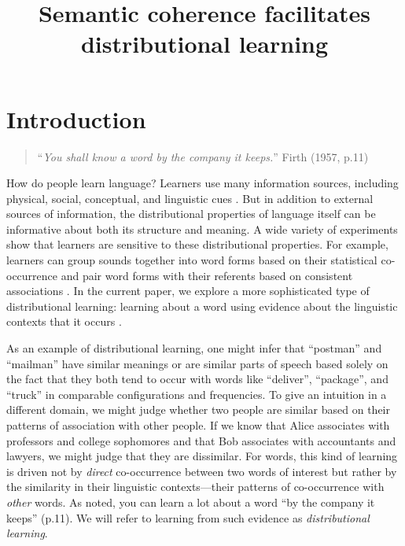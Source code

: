 \documentclass[man,longtable,floatsintext]{my-apa6}
\title{Semantic coherence facilitates distributional learning}
\begin{document}
\maketitle

\setcounter{secnumdepth}{3}

\section{Introduction}

\begin{quote}
``\emph{You shall know a word by the company it keeps.}'' Firth (1957, p.11)
\end{quote}

How do people learn language? Learners use many information sources, including physical, social, conceptual, and linguistic cues \citep{clark1988, markman1991, gleitman1990, baldwin1993, hollich2000}. But in addition to external sources of information, the distributional properties of language itself can be informative about both its structure and meaning. A wide variety of experiments show that learners are sensitive to these distributional properties. For example, learners can group sounds together into word forms based on their statistical co-occurrence \citep{saffran1996a, saffran1996b} and pair word forms with their referents based on consistent associations \citep{yu2007,smith2008}. In the current paper, we explore a more sophisticated type of distributional learning: learning about a word using evidence about the linguistic contexts that it occurs \citep{smith1966, maratsos1980, braine1987, redington1998}.

As an example of distributional learning, one might infer that ``postman'' and ``mailman'' have similar meanings or are similar parts of speech based solely on the fact that they both tend to occur with words like ``deliver'', ``package'', and ``truck'' in comparable configurations and frequencies. To give an intuition in a different domain, we might judge whether two people are similar based on their patterns of association with other people. If we know that Alice associates with professors and college sophomores and that Bob associates with accountants and lawyers, we might judge that they are dissimilar. For words, this kind of learning is driven not by \emph{direct} co-occurrence between two words of interest but rather by the similarity in their linguistic contexts---their patterns of co-occurrence with \emph{other} words. As \citet{firth1957} noted, you can learn a lot about a word ``by the company it keeps'' (p.11). We will refer to learning from such evidence as \emph{distributional learning}.
\end{document}

